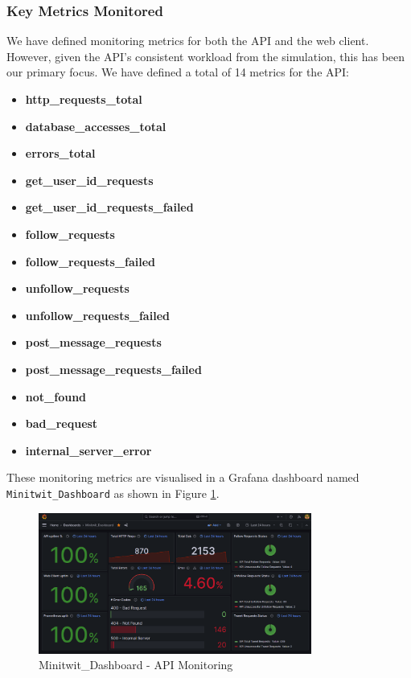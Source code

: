 \subsubsection*{Key Metrics Monitored}
We have defined monitoring metrics for both the API and the web client. However, given the API's consistent workload from the simulation, this has been our primary focus. We have defined a total of 14 metrics for the API:
\begin{multicols}{2}
\begin{itemize}
    \item \textbf{http\_requests\_total}
    \item \textbf{database\_accesses\_total}
    \item \textbf{errors\_total}
    \item \textbf{get\_user\_id\_requests}
    \item \textbf{get\_user\_id\_requests\_failed}
    \item \textbf{follow\_requests}
    \item \textbf{follow\_requests\_failed}
    \item \textbf{unfollow\_requests}
    \item \textbf{unfollow\_requests\_failed}
    \item \textbf{post\_message\_requests}
    \item \textbf{post\_message\_requests\_failed}
    \item \textbf{not\_found}
    \item \textbf{bad\_request}
    \item \textbf{internal\_server\_error}
\end{itemize}
\end{multicols}

These monitoring metrics are visualised in a Grafana dashboard named \texttt{Minitwit\_Dashboard} as shown in Figure \ref{fig:monitor_good}. 

\begin{figure}[H]
    \centering
    \includegraphics[width=0.8\textwidth]{images/monitor_good.png}
    \caption{Minitwit\_Dashboard - API Monitoring}
    \label{fig:monitor_good}
\end{figure}


